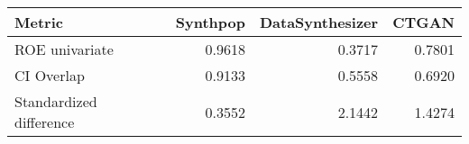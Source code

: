\begin{tabular}{lrrr}
  \toprule
Metric & Synthpop & DataSynthesizer & CTGAN \\ 
  \midrule
\medskip ROE univariate & 0.9618 & 0.3717 & 0.7801 \\ 
  CI Overlap & 0.9133 & 0.5558 & 0.6920 \\ 
  Standardized difference & 0.3552 & 2.1442 & 1.4274 \\ 
   \bottomrule
\end{tabular}
